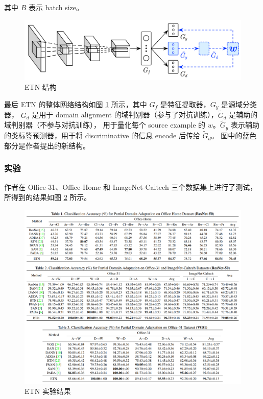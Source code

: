 \documentclass[UTF8]{ctexart}
\begin{document}
其中 $B$ 表示 batch size。

\begin{figure}[ht]
    \centering
    \includegraphics[scale=0.3]{Week10_ETN.png}
    \caption{ETN 结构}
    \label{fig:ETN}
\end{figure}

最后 ETN 的整体网络结构如图 \ref{fig:ETN} 所示，其中 $G_f$ 是特征提取器，$G_y$ 是源域分类器，
$G_d$ 是用于 domain alignment 的域判别器（参与了对抗训练），$\tilde{G}_d$ 是辅助的域判别器（不参与对抗训练），
用于量化每个 source example 的 $w$。$\tilde{G}_y$ 表示辅助的类标签预测器，用于将 discriminative 的信息 encode 后传给 $\tilde{G}_d$。
图中的蓝色部分是作者提出的新结构。

\subsubsection{实验}
作者在 Office-31、Office-Home 和 ImageNet-Caltech 三个数据集上进行了测试，所得到的结果如图 \ref{fig:test} 所示。

\begin{figure}[ht]
    \centering
    \includegraphics[scale=0.38]{Week10_test.png}
    \caption{ETN 实验结果}
    \label{fig:test}
\end{figure}
\end{document}
